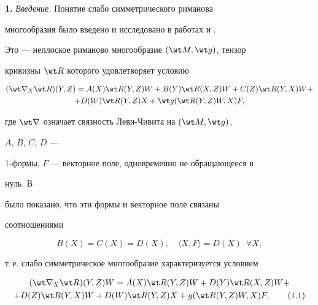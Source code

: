 




\maketitle


\label{begin}





{\bf 1.} {\it Введение.} Понятие слабо симметрического риманова


многообразия было введено и исследовано в работах \cite{1} и \cite{12}.


Это --- неплоское риманово многообразие $(\wt M,\wt g)$, тензор


кривизны $\wt R$ которого удовлетворяет условию


\begin{multline*}


(\wt\nabla_X\wt R)(Y,Z)=A(X)\wt R(Y,Z)W+


B(Y)\wt R(X,Z)W+C(Z)\wt R(Y,X)W+ \\


+D(W)\wt R(Y,Z)X+\wt g(\wt R(Y,Z)W,X)F,


\end{multline*}


где $\wt\nabla$ означает связность Леви-Чивита на $(\wt M,\wt g)$,


$A$, $B$, $C$, $D$ ---


1-формы, $F$ --- векторное поле, одновременно не обращающееся в


нуль. В


\cite{10} было показано, что эти формы и векторное поле связаны


соотношениями


$$


B(X)=C(X)=D(X),\quad \langle X,F\rangle=D(X) \ \;\forall X,


$$


т.\,е. слабо симметрическое многообразие характеризуется условием


\begin{multline}


(\wt\nabla_X\wt R)(Y,Z)W=A(X)\wt R(Y,Z)W+D(Y)\wt R(X,Z)W+ \\


+D(Z)\wt R(Y,X)W+D(W)\wt R(Y,Z)X+g(\wt R(Y,Z)W,X)F,\tag{1.1}


\end{multline}


